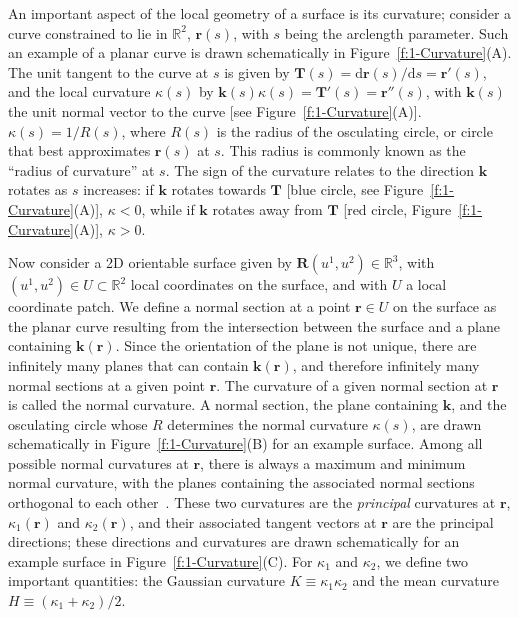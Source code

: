 An important aspect of the local geometry of a surface is its curvature; consider a curve constrained to lie in $\mathbb{R}^2$, $\mathbf{r}(s)$, with $s$ being the arclength parameter.
Such an example of a planar curve is drawn schematically in Figure~\ref{f:1-Curvature}(A).
The unit tangent to the curve at $s$ is given by $\mathbf{T}(s) = \textrm{d} \mathbf{r}(s)/\textrm{d}s = \mathbf{r}'(s)$, and the local curvature $\kappa(s)$ by $\mathbf{k}(s)\kappa(s) = \mathbf{T}'(s) = \mathbf{r}''(s) $, with $\mathbf{k}(s)$ the unit normal vector to the curve [see Figure~\ref{f:1-Curvature}(A)].
$\kappa(s) = 1/R(s)$, where $R(s)$ is the radius of the osculating circle, or circle that best approximates $\mathbf{r}(s)$ at $s$.
This radius is commonly known as the ``radius of curvature'' at $s$.
The sign of the curvature relates to the direction $\mathbf{k}$ rotates as $s$ increases: if $\mathbf{k}$ rotates towards $\mathbf{T}$ [blue circle, see Figure~\ref{f:1-Curvature}(A)], $\kappa < 0$, while if $\mathbf{k}$ rotates away from $\mathbf{T}$ [red circle, Figure~\ref{f:1-Curvature}(A)], $\kappa > 0$.

Now consider a 2D orientable surface given by $\mathbf{R}(u^1,u^2) \in \mathbb{R}^3$, with $(u^1,u^2) \in U \subset \mathbb{R}^2$ local coordinates on the surface, and with $U$ a local coordinate patch.
We define a normal section at a point $\mathbf{r} \in U$ on the surface as the planar curve resulting from the intersection between the surface and a plane containing $\mathbf{k}(\mathbf{r})$.
Since the orientation of the plane is not unique, there are infinitely many planes that can contain $\mathbf{k}(\mathbf{r})$, and therefore infinitely many normal sections at a given point $\mathbf{r}$.
The curvature of a given normal section at $\mathbf{r}$ is called the normal curvature.
A normal section, the plane containing $\mathbf{k}$, and the osculating circle whose $R$ determines the normal curvature $\kappa(s)$, are drawn schematically in Figure~\ref{f:1-Curvature}(B) for an example surface.
Among all possible normal curvatures at $\mathbf{r}$, there is always a maximum and minimum normal curvature, with the planes containing the associated normal sections orthogonal to each other~\cite{RN35}.
These two curvatures are the \textit{principal} curvatures at $\mathbf{r}$, $\kappa_1 (\mathbf{r})$ and $\kappa_2(\mathbf{r})$, and their associated tangent vectors at $\mathbf{r}$ are the principal directions; these directions and curvatures are drawn schematically for an example surface in Figure~\ref{f:1-Curvature}(C).
For $\kappa_1$ and $\kappa_2$, we define two important quantities: the Gaussian curvature $K  \equiv \kappa_1 \kappa_2$ and the mean curvature $H \equiv  (\kappa_1+\kappa_2)/2$.

